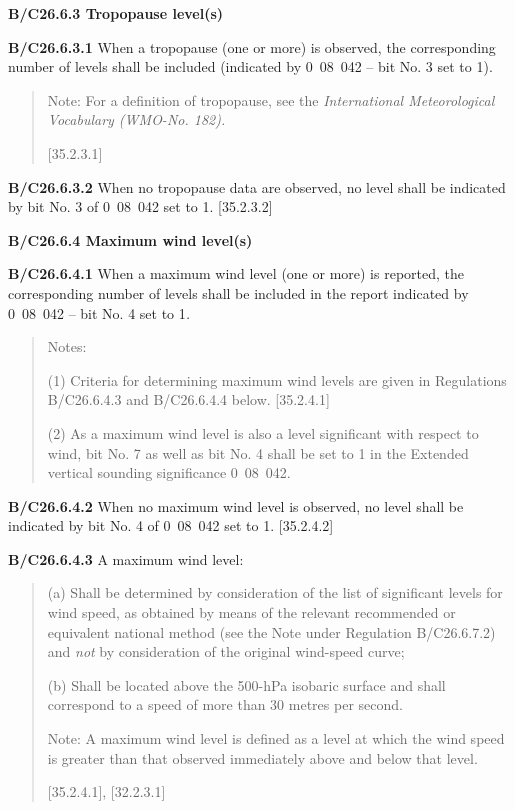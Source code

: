 \textbf{B/C26.6.3 Tropopause level(s)}

\textbf{B/C26.6.3.1} When a tropopause (one or more) is observed, the corresponding number of levels shall be included (indicated by 0~08~042 -- bit No. 3 set to 1).

\begin{quote}
Note: For a definition of tropopause, see the \emph{International Meteorological Vocabulary (WMO-No. 182).}

{[}35.2.3.1{]}
\end{quote}

\textbf{B/C26.6.3.2} When no tropopause data are observed, no level shall be indicated by bit No. 3 of 0~08~042 set to 1. {[}35.2.3.2{]}

\textbf{B/C26.6.4 Maximum wind level(s)}

\textbf{B/C26.6.4.1} When a maximum wind level (one or more) is reported, the corresponding number of levels shall be included in the report indicated by 0~08~042 -- bit No. 4 set to 1\emph{.}

\begin{quote}
Notes:

(1) Criteria for determining maximum wind levels are given in Regulations B/C26.6.4.3 and B/C26.6.4.4 below. {[}35.2.4.1{]}

(2) As a maximum wind level is also a level significant with respect to wind, bit No. 7 as well as bit No. 4 shall be set to 1 in the Extended vertical sounding significance 0~08~042.
\end{quote}

\textbf{B/C26.6.4.2} When no maximum wind level is observed, no level shall be indicated by bit No. 4 of 0~08~042 set to 1. {[}35.2.4.2{]}

\textbf{B/C26.6.4.3} A maximum wind level:

\begin{quote}
(a) Shall be determined by consideration of the list of significant levels for wind speed, as obtained by means of the relevant recommended or equivalent national method (see the Note under Regulation B/C26.6.7.2) and \emph{not} by consideration of the original wind-speed curve;

(b) Shall be located above the 500-hPa isobaric surface and shall correspond to a speed of more than 30 metres per second.

Note: A maximum wind level is defined as a level at which the wind speed is greater than that observed immediately above and below that level.

{[}35.2.4.1{]}, {[}32.2.3.1{]}
\end{quote}

